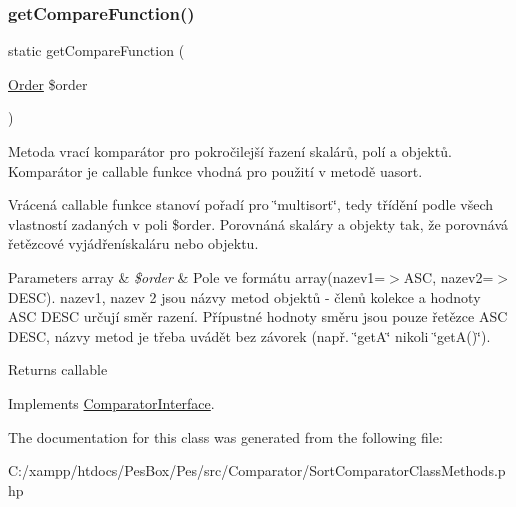\subsubsection{\texorpdfstring{get\+Compare\+Function()}{getCompareFunction()}}
{\footnotesize\ttfamily static get\+Compare\+Function (\begin{DoxyParamCaption}\item[{\mbox{\hyperlink{class_pes_1_1_query_1_1_order}{Order}}}]{\$order }\end{DoxyParamCaption})\hspace{0.3cm}{\ttfamily [static]}}

Metoda vrací komparátor pro pokročilejší řazení skalárů, polí a objektů. Komparátor je callable funkce vhodná pro použití v metodě uasort.

Vrácená callable funkce stanoví pořadí pro \char`\"{}multisort\char`\"{}, tedy třídění podle všech vlastností zadaných v poli \$order. Porovnáná skaláry a objekty tak, že porovnává řetězcové vyjádřenískaláru nebo objektu.


\begin{DoxyParams}[1]{Parameters}
array & {\em \$order} & Pole ve formátu array(\textquotesingle{}nazev1\textquotesingle{}=$>$\textquotesingle{}A\+SC\textquotesingle{}, \textquotesingle{}nazev2=$>$\textquotesingle{}D\+E\+SC\textquotesingle{}). nazev1, nazev 2 jsou názvy metod objektů -\/ členů kolekce a hodnoty \textquotesingle{}A\+SC\textquotesingle{} \textquotesingle{}D\+E\+SC\textquotesingle{} určují směr razení. Přípustné hodnoty směru jsou pouze řetězce \textquotesingle{}A\+SC\textquotesingle{} \textquotesingle{}D\+E\+SC\textquotesingle{}, názvy metod je třeba uvádět bez závorek (např. \char`\"{}get\+A\char`\"{} nikoli \char`\"{}get\+A()\char`\"{}). \\
\hline
\end{DoxyParams}
\begin{DoxyReturn}{Returns}
callable 
\end{DoxyReturn}


Implements \mbox{\hyperlink{interface_pes_1_1_comparator_1_1_comparator_interface_a21aeb75d37fce6724b5a60f836dfc85c}{Comparator\+Interface}}.



The documentation for this class was generated from the following file\+:\begin{DoxyCompactItemize}
\item 
C\+:/xampp/htdocs/\+Pes\+Box/\+Pes/src/\+Comparator/Sort\+Comparator\+Class\+Methods.\+php\end{DoxyCompactItemize}
